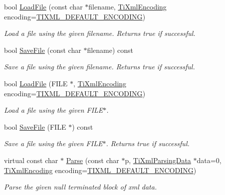 \begin{DoxyCompactItemize}
bool \hyperlink{classTiXmlDocument_a879cdf5e981b8b2d2ef82f2546dd28fb}{LoadFile} (const char $\ast$filename, \hyperlink{tinyxml_8h_a88d51847a13ee0f4b4d320d03d2c4d96}{TiXmlEncoding} encoding=\hyperlink{tinyxml_8h_ad5b8b092878e9010d6400cb6c13d4879}{TIXML\_\-DEFAULT\_\-ENCODING})
\begin{DoxyCompactList}\small\item\em Load a file using the given filename. Returns true if successful. \item\end{DoxyCompactList}\item 
bool \hyperlink{classTiXmlDocument_ae869f5ebf7fc54c4a1d737fb4689fd44}{SaveFile} (const char $\ast$filename) const 
\begin{DoxyCompactList}\small\item\em Save a file using the given filename. Returns true if successful. \item\end{DoxyCompactList}\item 
bool \hyperlink{classTiXmlDocument_a41f6fe7200864d1dca663d230caf8db6}{LoadFile} (FILE $\ast$, \hyperlink{tinyxml_8h_a88d51847a13ee0f4b4d320d03d2c4d96}{TiXmlEncoding} encoding=\hyperlink{tinyxml_8h_ad5b8b092878e9010d6400cb6c13d4879}{TIXML\_\-DEFAULT\_\-ENCODING})
\begin{DoxyCompactList}\small\item\em Load a file using the given FILE$\ast$. \item\end{DoxyCompactList}\item 
bool \hyperlink{classTiXmlDocument_acf1672b4538c6d1d441f9f108aea2bf4}{SaveFile} (FILE $\ast$) const 
\begin{DoxyCompactList}\small\item\em Save a file using the given FILE$\ast$. Returns true if successful. \item\end{DoxyCompactList}\item 
virtual const char $\ast$ \hyperlink{classTiXmlDocument_a789ad2f06f93d52bdb5570b2f3670289}{Parse} (const char $\ast$p, \hyperlink{classTiXmlParsingData}{TiXmlParsingData} $\ast$data=0, \hyperlink{tinyxml_8h_a88d51847a13ee0f4b4d320d03d2c4d96}{TiXmlEncoding} encoding=\hyperlink{tinyxml_8h_ad5b8b092878e9010d6400cb6c13d4879}{TIXML\_\-DEFAULT\_\-ENCODING})
\begin{DoxyCompactList}\small\item\em Parse the given null terminated block of xml data. \item\end{DoxyCompactList}\item 

\end{DoxyCompactItemize}
